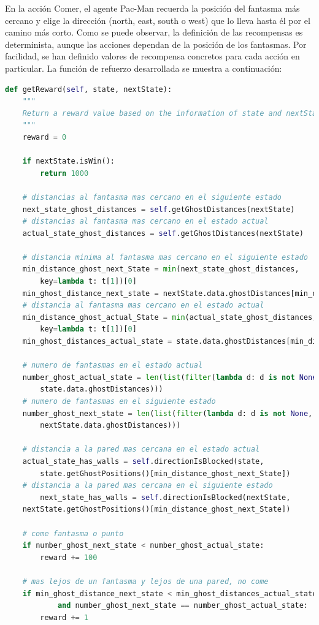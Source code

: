 \documentclass[11pt]{exam}
\begin{document}
En la acción Comer, el agente Pac-Man recuerda la posición del fantasma más cercano y elige la dirección (north, east, south o west) que lo lleva hasta él por el camino más corto. Como se puede observar, la definición de las recompensas es determinista, aunque las acciones dependan de la posición de los fantasmas. Por facilidad, se han definido valores de recompensa concretos para cada acción en particular. La función de refuerzo desarrollada se muestra a continuación:

\begin{lstlisting}[language=python, basicstyle=\footnotesize]
def getReward(self, state, nextState):
	"""
	Return a reward value based on the information of state and nextState
	"""
	reward = 0
	
	if nextState.isWin():
		return 1000
	
	# distancias al fantasma mas cercano en el siguiente estado
	next_state_ghost_distances = self.getGhostDistances(nextState)
	# distancias al fantasma mas cercano en el estado actual
	actual_state_ghost_distances = self.getGhostDistances(nextState)
	
	# distancia minima al fantasma mas cercano en el siguiente estado
	min_distance_ghost_next_State = min(next_state_ghost_distances, 
		key=lambda t: t[1])[0]
	min_ghost_distance_next_state = nextState.data.ghostDistances[min_distance_ghost_next_State]
	# distancia al fantasma mas cercano en el estado actual
	min_distance_ghost_actual_State = min(actual_state_ghost_distances, 
		key=lambda t: t[1])[0]
	min_ghost_distances_actual_state = state.data.ghostDistances[min_distance_ghost_actual_State]
	
	# numero de fantasmas en el estado actual
	number_ghost_actual_state = len(list(filter(lambda d: d is not None, 
		state.data.ghostDistances)))
	# numero de fantasmas en el siguiente estado
	number_ghost_next_state = len(list(filter(lambda d: d is not None, 
		nextState.data.ghostDistances)))
	
	# distancia a la pared mas cercana en el estado actual
	actual_state_has_walls = self.directionIsBlocked(state,
		state.getGhostPositions()[min_distance_ghost_next_State])
	# distancia a la pared mas cercana en el siguiente estado
		next_state_has_walls = self.directionIsBlocked(nextState,
	nextState.getGhostPositions()[min_distance_ghost_next_State])
	
	# come fantasma o punto
	if number_ghost_next_state < number_ghost_actual_state:
		reward += 100
	
	# mas lejos de un fantasma y lejos de una pared, no come
	if min_ghost_distance_next_state < min_ghost_distances_actual_state and not actual_state_has_walls \
			and number_ghost_next_state == number_ghost_actual_state:
		reward += 1
	

\end{lstlisting}
\end{document}
